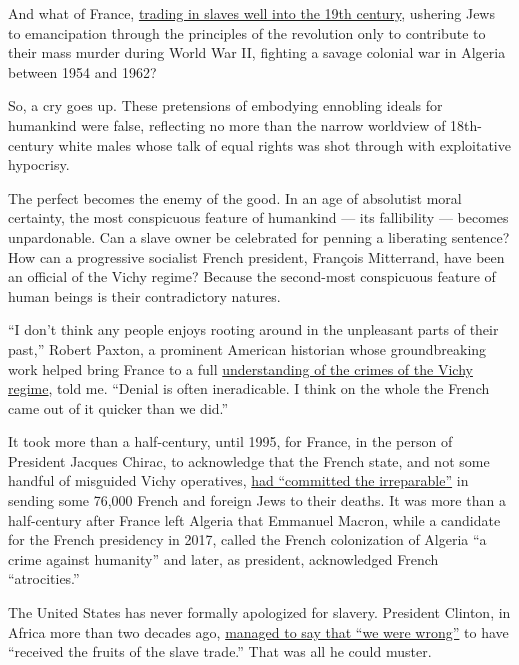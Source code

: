 And what of France,
\href{https://www.google.com/url?q=https://www.nytimes.com/2020/06/24/world/europe/france-george-floyd-racism-slave-trade.html\&sa=D\&ust=1595005716313000\&usg=AFQjCNGxqT9Pi2mklxELxZ0kkuOVj1qY0g}{trading
in slaves well into the 19th century}, ushering Jews to emancipation
through the principles of the revolution only to contribute to their
mass murder during World War II, fighting a savage colonial war in
Algeria between 1954 and 1962?

So, a cry goes up. These pretensions of embodying ennobling ideals for
humankind were false, reflecting no more than the narrow worldview of
18th-century white males whose talk of equal rights was shot through
with exploitative hypocrisy.

The perfect becomes the enemy of the good. In an age of absolutist moral
certainty, the most conspicuous feature of humankind --- its fallibility
--- becomes unpardonable. Can a slave owner be celebrated for penning a
liberating sentence? How can a progressive socialist French president,
François Mitterrand, have been an official of the Vichy regime? Because
the second-most conspicuous feature of human beings is their
contradictory natures.

``I don't think any people enjoys rooting around in the unpleasant parts
of their past,'' Robert Paxton, a prominent American historian whose
groundbreaking work helped bring France to a full
\href{https://www.nytimes.com/1997/11/01/world/us-historian-relates-how-vichy-france-served-nazis.html}{understanding
of the crimes of the Vichy regime}, told me. ``Denial is often
ineradicable. I think on the whole the French came out of it quicker
than we did.''

It took more than a half-century, until 1995, for France, in the person
of President Jacques Chirac, to acknowledge that the French state, and
not some handful of misguided Vichy operatives,
\href{https://www.nytimes.com/1995/07/17/world/chirac-affirms-france-s-guilt-in-fate-of-jews.html}{had
``committed the irreparable''} in sending some 76,000 French and foreign
Jews to their deaths. It was more than a half-century after France left
Algeria that Emmanuel Macron, while a candidate for the French
presidency in 2017, called the French colonization of Algeria ``a crime
against humanity'' and later, as president, acknowledged French
``atrocities.''

The United States has never formally apologized for slavery. President
Clinton, in Africa more than two decades ago,
\href{https://www.google.com/url?q=https://www.nytimes.com/1998/03/25/world/clinton-africa-overview-uganda-clinton-expresses-regret-slavery-us.html\&sa=D\&ust=1595008239423000\&usg=AFQjCNGGXNqmVDJsq_LlHavJsYM61duUkQ}{managed
to say that ``we were wrong''} to have ``received the fruits of the
slave trade.'' That was all he could muster.

